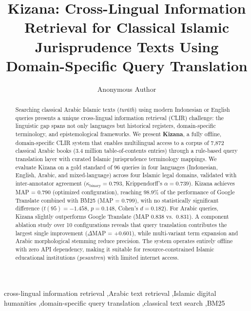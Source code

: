 \documentclass[preprint,12pt,authoryear]{elsarticle}
\begin{document}
\begin{frontmatter}

\title{Kizana: Cross-Lingual Information Retrieval for Classical Islamic Jurisprudence Texts Using Domain-Specific Query Translation}

\author[inst1]{Anonymous Author}


\begin{abstract}
Searching classical Arabic Islamic texts (\textit{tur\={a}th}) using modern Indonesian or English queries presents a unique cross-lingual information retrieval (CLIR) challenge: the linguistic gap spans not only languages but historical registers, domain-specific terminology, and epistemological frameworks. We present \textbf{Kizana}, a fully offline, domain-specific CLIR system that enables multilingual access to a corpus of 7,872 classical Arabic books (3.4 million table-of-contents entries) through a rule-based query translation layer with curated Islamic jurisprudence terminology mappings. We evaluate Kizana on a gold standard of 96 queries in four languages (Indonesian, English, Arabic, and mixed-language) across four Islamic legal domains, validated with inter-annotator agreement ($\kappa_{\text{binary}} = 0.793$, Krippendorff's $\alpha = 0.739$). Kizana achieves MAP = 0.790 (optimized configuration), reaching 98.9\% of the performance of Google Translate combined with BM25 (MAP = 0.799), with no statistically significant difference ($t(95) = -1.458$, $p = 0.148$, Cohen's $d = 0.182$). For Arabic queries, Kizana slightly outperforms Google Translate (MAP 0.838 vs.\ 0.831). A component ablation study over 10 configurations reveals that query translation contributes the largest single improvement ($\Delta$MAP = +0.601), while multi-variant term expansion and Arabic morphological stemming reduce precision. The system operates entirely offline with zero API dependency, making it suitable for resource-constrained Islamic educational institutions (\textit{pesantren}) with limited internet access.
\end{abstract}

\begin{keyword}
cross-lingual information retrieval \sep Arabic text retrieval \sep Islamic digital humanities \sep domain-specific query translation \sep classical text search \sep BM25
\end{keyword}

\end{frontmatter}
\end{document}
